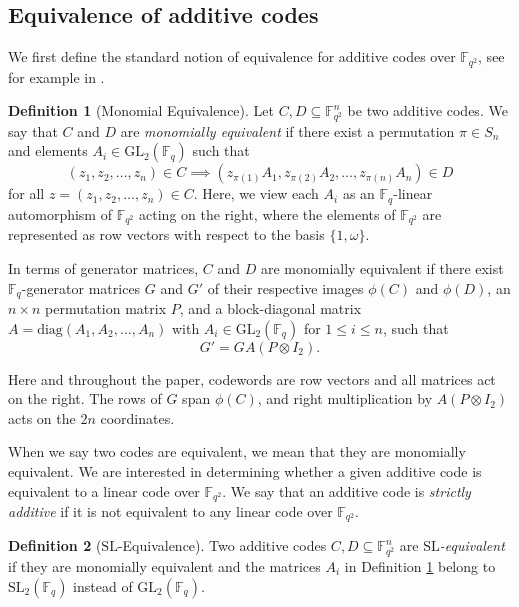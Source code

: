 \documentclass[a4paper,12pt]{article}
\theoremstyle{plain}
\theoremstyle{definition}
\newtheorem{definition}{Definition}[section]
\begin{document}
\subsection{Equivalence of additive codes}
 

We first define the standard notion of equivalence for additive codes over $\mathbb{F}_{q^2}$, see for example in \cite[Section 9.3]{bierbrauerconcise}. 

\begin{definition}[Monomial Equivalence] \label{monequiv}
Let $C, D \subseteq \mathbb{F}_{q^2}^n$ be two additive codes.
We say that $C$ and $D$ are \textit{monomially equivalent} if there exist a permutation $\pi \in S_n$ and elements $A_i \in \mathrm{GL}_2(\mathbb{F}_q)$ such that
\[
(z_1, z_2, \dots, z_n) \in C \implies (z_{\pi(1)} A_1, z_{\pi(2)} A_2, \dots, z_{\pi(n)} A_n) \in D
\]
for all $z = (z_1, z_2, \dots, z_n) \in C$. Here, we view each $A_i$ as an $\mathbb{F}_q$-linear automorphism of $\mathbb{F}_{q^2}$ acting on the right, where the elements of $\mathbb{F}_{q^2}$ are represented as row vectors with respect to the basis $\{1, \omega\}$. 

In terms of generator matrices, $C$ and $D$ are monomially equivalent if there exist $\mathbb{F}_q$-generator matrices $G$ and $G'$ of their respective images $\phi(C)$ and $\phi(D)$, an $n \times n$ permutation matrix $P$, and a block-diagonal matrix $A = \mathrm{diag}(A_1, A_2, \dots, A_n)$ with $A_i \in \mathrm{GL}_2(\mathbb{F}_q)$ for $1 \le i \le n$, such that
\begin{equation}
G' = G A (P \otimes I_2).
\end{equation}
\end{definition}

Here  and throughout the paper, codewords are row vectors and all matrices act on the right. The rows of $G$ span $\phi(C)$, and right multiplication by $A(P \otimes I_2)$ acts on the $2n$ coordinates.


When we say two codes are equivalent, we mean that they are monomially equivalent. We are interested in  determining whether a given additive code is equivalent to a linear code over $\mathbb{F}_{q^2}$. We say that an additive code is \textit{strictly additive} if it is not equivalent to any linear code over $\mathbb{F}_{q^2}$.


\begin{definition}[$\mathrm{SL}$-Equivalence] \label{slequiv}
Two additive codes $C, D \subseteq \mathbb{F}_{q^2}^n$ are \textit{$\mathrm{SL}$-equivalent} if they are monomially equivalent and the matrices $A_i$ in Definition \ref{monequiv} belong to $\mathrm{SL}_2(\mathbb{F}_q)$ instead of $\mathrm{GL}_2(\mathbb{F}_q)$.
\end{definition}
\end{document}

